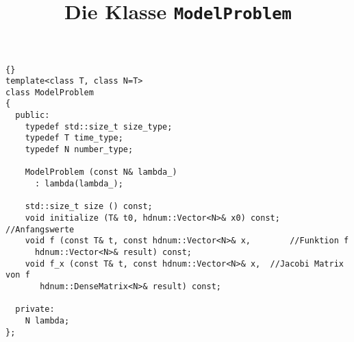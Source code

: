 \documentclass[a4paper,11pt]{article}
\theoremstyle{definition}
\begin{document}
\title{\textbf{Die Klasse \lstinline{ModelProblem}}}
{\footnotesize{\begin{lstlisting}{}
template<class T, class N=T> 
class ModelProblem
{
  public:
    typedef std::size_t size_type; 
    typedef T time_type;
    typedef N number_type;

    ModelProblem (const N& lambda_)
      : lambda(lambda_);

    std::size_t size () const;                       
    void initialize (T& t0, hdnum::Vector<N>& x0) const;  //Anfangswerte 
    void f (const T& t, const hdnum::Vector<N>& x,        //Funktion f
      hdnum::Vector<N>& result) const; 
    void f_x (const T& t, const hdnum::Vector<N>& x,  //Jacobi Matrix von f
       hdnum::DenseMatrix<N>& result) const;

  private:
    N lambda;
};
\end{lstlisting}}}
\end{document}
